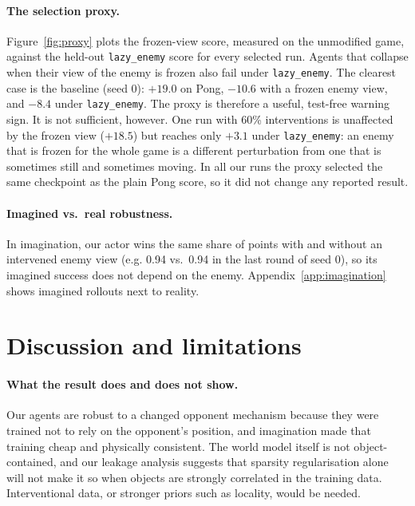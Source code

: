 \documentclass{article}
\makeatletter
\newcommand{\lazy}{\texttt{lazy\_enemy}}
\newcommand{\eg}{e.g.\@\xspace}
\makeatother
\begin{document}
\paragraph{The selection proxy.} Figure~\ref{fig:proxy} plots the frozen-view score, measured on the
unmodified game, against the held-out \lazy{} score for every selected run. Agents that collapse when
their view of the enemy is frozen also fail under \lazy{}. The clearest case is the baseline (seed 0):
$+19.0$ on Pong, $-10.6$ with a frozen enemy view, and $-8.4$ under \lazy{}. The proxy is
therefore a useful, test-free warning sign. It is not sufficient, however. One run with 60\%
interventions is unaffected by the frozen view ($+18.5$) but reaches only $+3.1$ under \lazy{}: an
enemy that is frozen for the whole game is a different perturbation from one that is sometimes
still and sometimes moving. In all our runs the proxy selected the same checkpoint as the plain Pong
score, so it did not change any reported result.

\paragraph{Imagined vs.\ real robustness.} In imagination, our actor wins the same share of points
with and without an intervened enemy view (\eg 0.94 vs.\ 0.94 in the last round of seed 0), so its
imagined success does not depend on the enemy. Appendix~\ref{app:imagination} shows imagined rollouts
next to reality.

\section{Discussion and limitations}
\label{sec:discussion}

\paragraph{What the result does and does not show.} Our agents are robust to a changed opponent
mechanism because they were trained not to rely on the opponent's position, and imagination made
that training cheap and physically consistent. The world model itself is not object-contained, and
our leakage analysis suggests that sparsity regularisation alone will not make it so when objects
are strongly correlated in the training data. Interventional data, or stronger priors such as
locality, would be needed.
\end{document}

